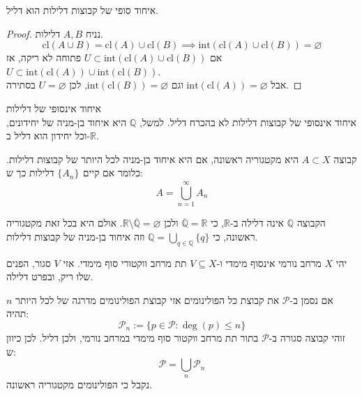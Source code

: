 \documentclass{tstextbook}
\begin{document}
\begin{proposition}
איחוד סופי של קבוצות דלילות הוא דליל.

\end{proposition}
\begin{proof}
נניח \(A,B\) דלילות.\\
$$\text{cl}\left( A\cup B \right)=\text{cl}(A)\cup \text{cl}(B)\implies \text{int}\left( \text{cl}(A)\cup \text{cl}(B) \right)=\varnothing$$
אם \(U\subset \text{int}\left( \text{cl}(A)\cup \text{cl}(B) \right)\) פתוחה לא ריקה, אז \(U\subset \text{int}\left( \text{cl}(A) \right)\cup \text{int}\left( \text{cl}(B) \right)\).\\

אבל \(\text{int}\left( \text{cl}(A) \right)=\varnothing\) וגם \(\text{int}\left( \text{cl}(B) \right)=\varnothing\), לכן \(U=\varnothing\) בסתירה.

\end{proof}
\begin{remark}
איחוד אינסופי של דלילות\\

איחוד אינסופי של קבוצות דלילות לא בהכרח דליל. למשל, \(\mathbb{Q}\) היא איחוד בן-מניה של יחידונים, וכל יחידון הוא דליל ב-\(\mathbb{R}\).

\end{remark}
\begin{definition}
קבוצה \(A\subset X\) היא מקטגוריה ראשונה, אם היא איחוד בן-מניה לכל היותר של קבוצות דלילות. כלומר אם קיים \(\{ A_{n} \}_{}\) דלילות כך ש:
$$A=\bigcup_{n=1}^{\infty}A_{n}$$

\end{definition}
\begin{example}[הרציונאלים]
הקבוצה \(\mathbb{Q}\) אינה דלילה ב-\(\mathbb{R}\), כי \(\overline{\mathbb{Q}}=\mathbb{R}\) ולכן \(\mathbb{R}\setminus\overline{\mathbb{Q}}=\varnothing\). אולם היא בכל זאת מקטגוריה ראשונה, כי \(\mathbb{Q}=\bigcup_{q\in\mathbb{Q}}\{q\}\) וזה איחוד בן-מניה של קבוצות דלילות.

\end{example}
\begin{lemma}
יהי \(X\) מרחב נורמי אינסוף מימדי ו-\(V\subseteq X\) תת מרחב ווקטורי סוף מימדי. אזי \(V\) סגור, הפנים שלו ריק, ובפרט דלילה.

\end{lemma}
\begin{example}[הפולינומים]
אם נסמן ב-\(\mathcal{P}\) את קבוצת כל הפולינומים אזי קבוצת הפולינומים מדרגה של לכל היותר \(n\) תהיה:
$${\mathcal{P}}_{n}:=\{p\in{\mathcal{P}}:\deg(p)\leq n\}$$
זוהי קבוצה סגורה ב-\(\mathcal{P}\) בתור תת מרחב ווקטור סוף מימדי במרחב נורמי, ולכן דליל. לכן כיוון ש:
$$\mathcal{P}=\bigcup_{n}\mathcal{P} _{n} $$
נקבל כי הפולינומים מקטגוריה ראשונה.

\end{example}
\end{document}
